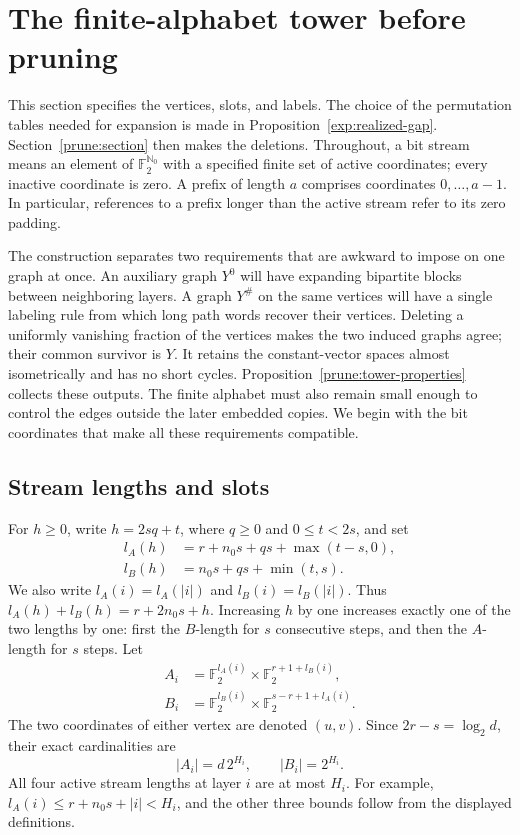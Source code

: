 \section{The finite-alphabet tower before pruning}
\label{tow:section}

This section specifies the vertices, slots, and labels.  The choice of the
permutation tables needed for expansion is made in
Proposition~\ref{exp:realized-gap}.  Section~\ref{prune:section} then makes
the deletions.  Throughout, a bit stream means an element of
\(\mathbb F _2^{\mathbb N_0}\) with a specified finite set of active
coordinates; every inactive coordinate is zero.  A prefix of length
\(a\) comprises coordinates \(0,\ldots,a-1\).  In particular, references
to a prefix longer than the active stream refer to its zero padding.

The construction separates two requirements that are awkward to impose
on one graph at once. An auxiliary graph \(Y^0\) will have expanding
bipartite blocks between neighboring layers. A graph \(Y^\#\) on the same
vertices will have a single labeling rule from which long path words
recover their vertices. Deleting a uniformly vanishing fraction of the
vertices makes the two induced graphs agree; their common survivor is
\(Y\). It retains the constant-vector spaces almost isometrically and
has no short cycles. Proposition~\ref{prune:tower-properties} collects
these outputs. The finite alphabet must also remain small enough to
control the edges outside the later embedded copies. We begin with the
bit coordinates that make all these requirements compatible.

\subsection{Stream lengths and slots}

For \(h\geq0\), write \(h=2sq+t\), where \(q\geq0\) and
\(0\leq t<2s\), and set
\begin{equation}
\begin{split}
 l_A(h)&=r+n_0s+qs+\max(t-s,0),\\
 l_B(h)&=n_0s+qs+\min(t,s).
\end{split}
\label{tow:stream-lengths}
\end{equation}
We also write \(l_A(i)=l_A(|i|)\) and \(l_B(i)=l_B(|i|)\).
Thus \(l_A(h)+l_B(h)=r+2n_0s+h\).  Increasing \(h\) by one increases
exactly one of the two lengths by one: first the \(B\)-length for
\(s\) consecutive steps, and then the \(A\)-length for \(s\) steps.
Let
\[
 \begin{split}
 A_i&=\mathbb F _2^{l_A(i)}\times
       \mathbb F _2^{r+1+l_B(i)},\\
 B_i&=\mathbb F _2^{l_B(i)}\times
       \mathbb F _2^{s-r+1+l_A(i)}.
 \end{split}
\]
The two coordinates of either vertex are denoted \((u,v)\).
Since \(2r-s=\log_2d\), their exact cardinalities are
\begin{equation}
 |A_i|=d\,2^{H_i},\qquad |B_i|=2^{H_i}.
 \label{tow:cardinalities}
\end{equation}
All four active stream lengths at layer \(i\) are at most \(H_i\).
For example, \(l_A(i)\leq r+n_0s+|i|<H_i\), and the other three
bounds follow from the displayed definitions.

